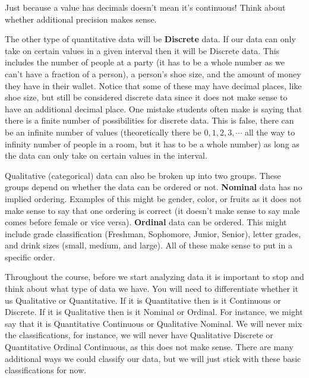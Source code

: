 \documentclass[
  letterpaper,
  DIV=11,
  numbers=noendperiod]{scrreprt}
\begin{document}
\begin{tcolorbox}[enhanced jigsaw, colframe=quarto-callout-warning-color-frame, colback=white, breakable, rightrule=.15mm, title=\textcolor{quarto-callout-warning-color}{\faExclamationTriangle}\hspace{0.5em}{Warning}, bottomtitle=1mm, toptitle=1mm, titlerule=0mm, left=2mm, coltitle=black, colbacktitle=quarto-callout-warning-color!10!white, leftrule=.75mm, opacitybacktitle=0.6, bottomrule=.15mm, opacityback=0, arc=.35mm, toprule=.15mm]

Just because a value has decimals doesn't mean it's continuous! Think
about whether additional precision makes sense.

\end{tcolorbox}

The other type of quantitative data will be \textbf{Discrete} data. If
our data can only take on certain values in a given interval then it
will be Discrete data. This includes the number of people at a party (it
has to be a whole number as we can't have a fraction of a person), a
person's shoe size, and the amount of money they have in their wallet.
Notice that some of these may have decimal places, like shoe size, but
still be considered discrete data since it does not make sense to have
an additional decimal place. One mistake students often make is saying
that there is a finite number of possibilities for discrete data. This
is false, there can be an infinite number of values (theoretically there
be \(0, 1, 2, 3, \cdots\) all the way to infinity number of people in a
room, but it has to be a whole number) as long as the data can only take
on certain values in the interval.

Qualitative (categorical) data can also be broken up into two groups.
These groups depend on whether the data can be ordered or not.
\textbf{Nominal} data has no implied ordering. Examples of this might be
gender, color, or fruits as it does not make sense to say that one
ordering is correct (it doesn't make sense to say male comes before
female or vice versa). \textbf{Ordinal} data can be ordered. This might
include grade classification (Freshman, Sophomore, Junior, Senior),
letter grades, and drink sizes (small, medium, and large). All of these
make sense to put in a specific order.

Throughout the course, before we start analyzing data it is important to
stop and think about what type of data we have. You will need to
differentiate whether it us Qualitative or Quantitative. If it is
Quantitative then is it Continuous or Discrete. If it is Qualitative
then is it Nominal or Ordinal. For instance, we might say that it is
Quantitative Continuous or Qualitative Nominal. We will never mix the
classifications, for instance, we will never have Qualitative Discrete
or Quantitative Ordinal Continuous, as this does not make sense. There
are many additional ways we could classify our data, but we will just
stick with these basic classifications for now.
\end{document}
